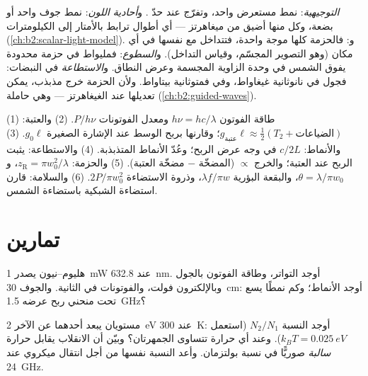 \begin{remark}\label{rem:b2:laser:special}
\emph{التوجيهية}: نمط مستعرض واحد، وتفرّج عند حدّ
. و\emph{أحادية اللون}: نمط جوف واحد أو بضعة، وكل منها
أضيق من ميغاهرتز --- أي أطوال ترابط بالأمتار إلى الكيلومترات
(\cref{ch:b2:scalar-light-model}). و\emph{}: فالحزمة
كلها موجة واحدة، فتتداخل مع نفسها في أي مكان (وهو التصوير المجسّم،
وقياس التداخل). و\emph{السطوع}: فمليواط في حزمة محدودة
 يفوق الشمس في وحدة الزاوية المجسمة وعرض النطاق. و\emph{الاستطاعة}
في النبضات: فجول في نانوثانية غيغاواط، وفي فمتوثانية
بيتاواط. ولأن الحزمة خرج مذبذب، يمكن
تعديلها عند الغيغاهرتز --- وهي حاملة 
(\cref{ch:b2:guided-waves}).
\end{remark}

\begin{method}\label{meth:b2:laser:method}
(1) طاقة الفوتون $h\nu = hc/\lambda$ ومعدل الفوتونات $P/h\nu$.
(2) والعتبة: $g_{\text{عتبة}}\ell \approx \tfrac12(T_2 + \text{الضياعات})$؛
وقارنها بربح الوسط عند الإشارة الصغيرة $g_0\ell$.
(3) والأنماط: $c/2L$ في وجه عرض الربح؛ وعُدّ الأنماط المتذبذبة.
(4) والاستطاعة: يثبت الربح عند العتبة؛ والخرج $\propto$ (المضخّة $-$
مضخّة العتبة). (5) والحزمة: $z_{\text{R}} = \pi w_0^2/\lambda$، و $\theta =
\lambda/\pi w_0$، والبقعة البؤرية $\lambda f/\pi w$، وذروة الاستضاءة
$2P/\pi w_0^2$. (6) والسلامة: قارن استضاءة الشبكية باستضاءة
الشمس.
\end{method}

\section{تمارين}

\begin{exercise}[$\star$]\label{exo:b2:laser:1}
 هليوم--نيون يصدر \qty{1}{mW} عند \qty{632.8}{nm}. أوجد التواتر، وطاقة
الفوتون بالجول وبالإلكترون فولت، والفوتونات في الثانية. والجوف
\qty{30}{cm}: أوجد  الأنماط؛ وكم نمطًا يسع تحت منحني ربح
عرضه \qty{1.5}{GHz}؟
\end{exercise}

\begin{exercise}[$\star$]\label{exo:b2:laser:2}
مستويان يبعد أحدهما عن الآخر \qty{2}{eV} عند \qty{300}{K}: أوجد النسبة $N_2/N_1$ (استعمل
$k_BT = \qty{0.025}{eV}$). وعند أي حرارة تتساوى الجمهرتان؟
وبيّن أن الانقلاب يقابل حرارة \emph{سالبة} صوريًّا
في نسبة بولتزمان. وأعد النسبة نفسها من أجل انتقال ميكروي
عند \qty{24}{GHz}.
\end{exercise}

